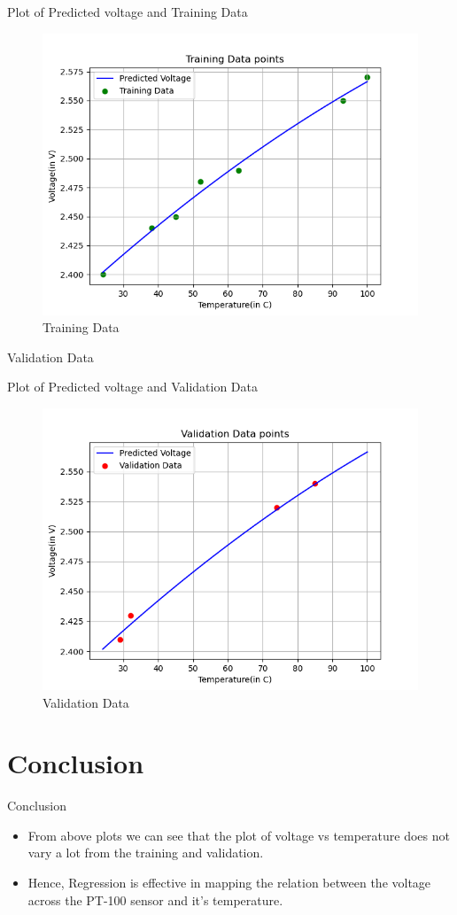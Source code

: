\documentclass{beamer}
\theoremstyle{remark}
\begin{document}
\begin{frame}{Plot of Predicted voltage and Training Data}
	\begin{figure}[!ht]
    \centering
    \includegraphics[width=0.6\columnwidth]{figs/Training_Data.png}
    \caption{Training Data}
    \label{fig:T_Data}
	\end{figure}
\end{frame}

\begin{frame}{Validation Data}
    \begin{table}[!ht]
    	\centering
    	
    	\caption{Validation data}
    	\label{tab:valid}
	\end{table}
\end{frame}

\begin{frame}{Plot of Predicted voltage and Validation Data}
	\begin{figure}[!ht]
    \centering
    \includegraphics[width=0.6\columnwidth]{figs/Validation_Data.png}
    \caption{Validation Data}
    \label{fig:V_Data}
	\end{figure}
\end{frame}

\section{Conclusion}
\begin{frame}{Conclusion}
	\begin{itemize}
		\item From above plots we can see that the plot of voltage vs temperature does not vary a lot from the training and validation.
		\item Hence, Regression is effective in mapping the relation between the voltage across the PT-100 sensor and it's temperature.
	\end{itemize}
\end{frame}
\end{document}
